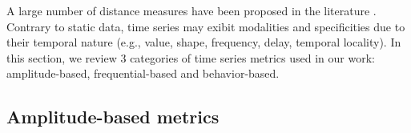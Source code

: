 A large number of distance measures have been proposed in the literature \cite{Montero2014}. Contrary to static data, time series may exibit modalities and specificities due to their temporal nature (e.g., value, shape, frequency, delay, temporal locality). In this section, we review 3 categories of time series metrics used in our work: amplitude-based, frequential-based and behavior-based.



%




\subsection{Amplitude-based metrics}
\label{sec:TSmetrics}

